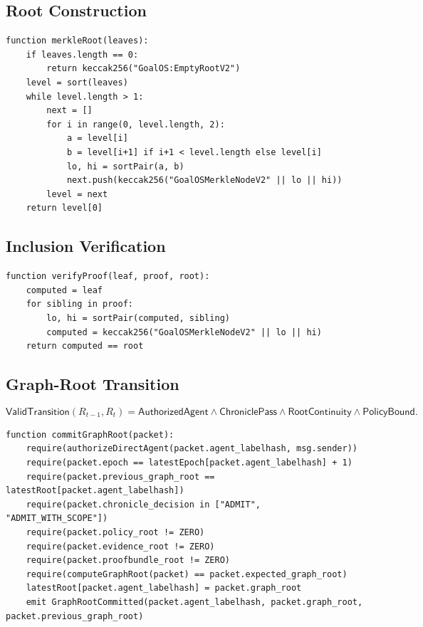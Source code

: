 \documentclass[11pt,letterpaper]{article}
\begin{document}
\subsection{Root Construction}
\begin{lstlisting}[caption={Sorted-pair Merkle root.}]
function merkleRoot(leaves):
    if leaves.length == 0:
        return keccak256("GoalOS:EmptyRootV2")
    level = sort(leaves)
    while level.length > 1:
        next = []
        for i in range(0, level.length, 2):
            a = level[i]
            b = level[i+1] if i+1 < level.length else level[i]
            lo, hi = sortPair(a, b)
            next.push(keccak256("GoalOSMerkleNodeV2" || lo || hi))
        level = next
    return level[0]
\end{lstlisting}

\subsection{Inclusion Verification}
\begin{lstlisting}[caption={Merkle membership proof verification.}]
function verifyProof(leaf, proof, root):
    computed = leaf
    for sibling in proof:
        lo, hi = sortPair(computed, sibling)
        computed = keccak256("GoalOSMerkleNodeV2" || lo || hi)
    return computed == root
\end{lstlisting}

\subsection{Graph-Root Transition}
\begin{equation}
\mathsf{ValidTransition}(R_{t-1}, R_t) = \mathsf{AuthorizedAgent} \land \mathsf{ChroniclePass} \land \mathsf{RootContinuity} \land \mathsf{PolicyBound}.\label{eq:transition}
\end{equation}
\begin{lstlisting}[caption={Graph-root update rule.}]
function commitGraphRoot(packet):
    require(authorizeDirectAgent(packet.agent_labelhash, msg.sender))
    require(packet.epoch == latestEpoch[packet.agent_labelhash] + 1)
    require(packet.previous_graph_root == latestRoot[packet.agent_labelhash])
    require(packet.chronicle_decision in ["ADMIT", "ADMIT_WITH_SCOPE"])
    require(packet.policy_root != ZERO)
    require(packet.evidence_root != ZERO)
    require(packet.proofbundle_root != ZERO)
    require(computeGraphRoot(packet) == packet.expected_graph_root)
    latestRoot[packet.agent_labelhash] = packet.graph_root
    emit GraphRootCommitted(packet.agent_labelhash, packet.graph_root, packet.previous_graph_root)
\end{lstlisting}
\end{document}
